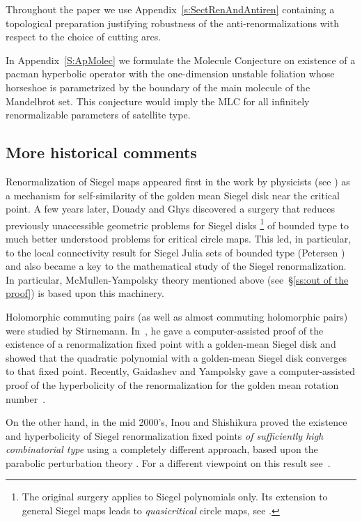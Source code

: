 \documentclass[]{amsart}
\theoremstyle{remark}
\numberwithin{equation}{section}
\theoremstyle{definition}
\begin{document}
Throughout the paper we use Appendix~\ref{s:SectRenAndAntiren} containing a topological preparation justifying robustness
 of the anti-renormalizations with respect to the choice of cutting
 arcs.


In Appendix~\ref{S:ApMolec} we formulate the Molecule Conjecture on existence of a pacman hyperbolic operator with the one-dimension unstable foliation whose horseshoe is parametrized by the boundary of the main molecule of the Mandelbrot set. This conjecture would imply the MLC for all infinitely renormalizable parameters of satellite type.
 

\subsection{More historical comments}
\label{ss:hist comments}


 Renormalization of Siegel  maps appeared first in the work by physicists (see \cites{Wi, MN,MP})
as a mechanism for self-similarity of the golden mean Siegel disk near the critical point.
A few years later, Douady and Ghys  discovered a surgery that reduces
previously unaccessible  geometric problems for Siegel disks%
\footnote{The original  surgery applies to Siegel  polynomials only. Its
  extension to general Siegel maps leads to {\em quasicritical} circle maps,
  see \cite{AL-posmeas}.}  
 of bounded type to much better understood problems for critical circle maps. 
This led, in particular, to the local connectivity result for Siegel Julia sets of bounded type (Petersen \cite{Pe}) and
 also  became a  key to the mathematical study of the Siegel renormalization.
In particular,  McMullen-Yampolsky theory mentioned above (see~\S\ref{ss:out of the proof}) is based upon this machinery. 

Holomorphic commuting pairs (as well as almost commuting holomorphic pairs)
were studied by Stirnemann. In~\cite{St}, he gave a computer-assisted proof of the existence of a renormalization fixed point with a golden-mean Siegel disk and showed that the  quadratic
polynomial with a golden-mean Siegel disk converges to that fixed point. Recently, Gaidashev and Yampolsky gave a computer-assisted proof of the hyperbolicity of the renormalization for the golden mean rotation number~\cite{GY}.




On the other hand, in the mid 2000's, Inou and Shishikura proved the existence and hyperbolicity
 of Siegel renormalization fixed points {\em of  sufficiently high combinatorial type} using a completely
different approach, based upon the parabolic perturbation theory \cite{IS}. For a different viewpoint on this result see~\cite{Ya-posmeas}. 
\end{document}
